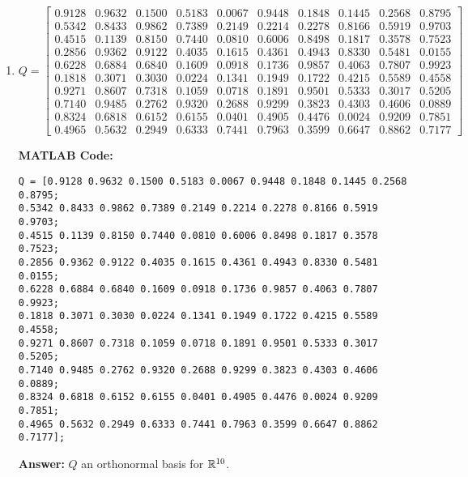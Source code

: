 \documentclass{ximera}
\begin{document}
\begin{example}
\begin{enumerate}
\item \[
Q = \begin{bmatrix} 
0.9128 & 0.9632 & 0.1500 & 0.5183 & 0.0067 & 0.9448 & 0.1848 & 0.1445 & 0.2568 & 0.8795 \\
0.5342 & 0.8433 & 0.9862 & 0.7389 & 0.2149 & 0.2214 & 0.2278 & 0.8166 & 0.5919 & 0.9703 \\
0.4515 & 0.1139 & 0.8150 & 0.7440 & 0.0810 & 0.6006 & 0.8498 & 0.1817 & 0.3578 & 0.7523 \\
0.2856 & 0.9362 & 0.9122 & 0.4035 & 0.1615 & 0.4361 & 0.4943 & 0.8330 & 0.5481 & 0.0155 \\
0.6228 & 0.6884 & 0.6840 & 0.1609 & 0.0918 & 0.1736 & 0.9857 & 0.4063 & 0.7807 & 0.9923 \\
0.1818 & 0.3071 & 0.3030 & 0.0224 & 0.1341 & 0.1949 & 0.1722 & 0.4215 & 0.5589 & 0.4558 \\
0.9271 & 0.8607 & 0.7318 & 0.1059 & 0.0718 & 0.1891 & 0.9501 & 0.5333 & 0.3017 & 0.5205 \\
0.7140 & 0.9485 & 0.2762 & 0.9320 & 0.2688 & 0.9299 & 0.3823 & 0.4303 & 0.4606 & 0.0889 \\
0.8324 & 0.6818 & 0.6152 & 0.6155 & 0.0401 & 0.4905 & 0.4476 & 0.0024 & 0.9209 & 0.7851 \\
0.4965 & 0.5632 & 0.2949 & 0.6333 & 0.7441 & 0.7963 & 0.3599 & 0.6647 & 0.8862 & 0.7177
\end{bmatrix}
\]

\textbf{MATLAB Code:}
\begin{verbatim}
Q = [0.9128 0.9632 0.1500 0.5183 0.0067 0.9448 0.1848 0.1445 0.2568 0.8795;
0.5342 0.8433 0.9862 0.7389 0.2149 0.2214 0.2278 0.8166 0.5919 0.9703;
0.4515 0.1139 0.8150 0.7440 0.0810 0.6006 0.8498 0.1817 0.3578 0.7523;
0.2856 0.9362 0.9122 0.4035 0.1615 0.4361 0.4943 0.8330 0.5481 0.0155;
0.6228 0.6884 0.6840 0.1609 0.0918 0.1736 0.9857 0.4063 0.7807 0.9923;
0.1818 0.3071 0.3030 0.0224 0.1341 0.1949 0.1722 0.4215 0.5589 0.4558;
0.9271 0.8607 0.7318 0.1059 0.0718 0.1891 0.9501 0.5333 0.3017 0.5205;
0.7140 0.9485 0.2762 0.9320 0.2688 0.9299 0.3823 0.4303 0.4606 0.0889;
0.8324 0.6818 0.6152 0.6155 0.0401 0.4905 0.4476 0.0024 0.9209 0.7851;
0.4965 0.5632 0.2949 0.6333 0.7441 0.7963 0.3599 0.6647 0.8862 0.7177];
\end{verbatim}

\textbf{Answer:}
$Q$  an orthonormal basis for $\mathbb{R}^{10}$.


\end{enumerate}
\end{example}
\end{document}
